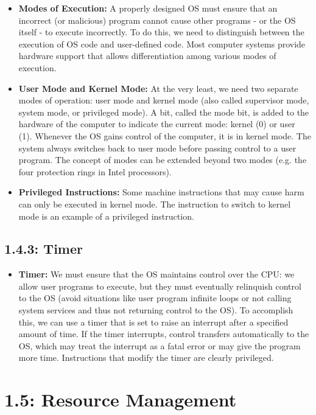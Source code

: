 \documentclass[12pt]{article}
\begin{document}
\begin{itemize}
    \item \textbf{Modes of Execution:} A properly designed OS must ensure that an incorrect (or malicious) program cannot cause other programs - or the OS itself - to execute incorrectly. To do this, we need to distinguish between the execution of OS code and user-defined code. Most computer systems provide hardware support that allows differentiation among various modes of execution.
    \item \textbf{User Mode and Kernel Mode:} At the very least, we need two separate modes of operation: user mode and kernel mode (also called supervisor mode, system mode, or privileged mode). A bit, called the mode bit, is added to the hardware of the computer to indicate the current mode: kernel (0) or user (1). Whenever the OS gains control of the computer, it is in kernel mode. The system always switches back to user mode before passing control to a user program. The concept of modes can be extended beyond two modes (e.g. the four protection rings in Intel processors).
    \item \textbf{Privileged Instructions:} Some machine instructions that may cause harm can only be executed in kernel mode. The instruction to switch to kernel mode is an example of a privileged instruction.
\end{itemize}

\subsection*{1.4.3: Timer}

\begin{itemize}
    \item \textbf{Timer:} We must ensure that the OS maintains control over the CPU: we allow user programs to execute, but they must eventually relinquish control to the OS (avoid situations like user program infinite loops or not calling system services and thus not returning control to the OS). To accomplish this, we can use a timer that is set to raise an interrupt after a specified amount of time. If the timer interrupts, control transfers automatically to the OS, which may treat the interrupt as a fatal error or may give the program more time. Instructions that modify the timer are clearly privileged.
\end{itemize}

\section*{1.5: Resource Management}
\end{document}
